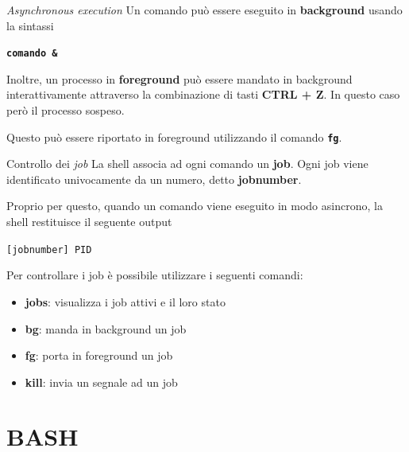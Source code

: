 \documentclass{beamer}
\begin{document}
    \begin{frame}{\textit{Asynchronous execution}}
        Un comando può essere eseguito in \textbf{background} usando la sintassi
        \begin{center}
            \texttt{\textbf{comando \&}}
        \end{center}

        \vspace{0.5cm}

        Inoltre, un processo in \textbf{foreground} può essere mandato
        in background interattivamente attraverso la combinazione di tasti
        \textbf{CTRL + Z}. In questo caso però il processo sospeso.

        \vspace{0.5cm}

        Questo può essere riportato in foreground utilizzando il comando \texttt{\textbf{fg}}.
    \end{frame}

    \begin{frame}{Controllo dei \textit{job}}
        La shell associa ad ogni comando un \textbf{job}. Ogni job
        viene identificato univocamente da un numero, detto \textbf{jobnumber}.

        Proprio per questo, quando un comando viene eseguito in modo asincrono, la shell restituisce il seguente output
        \begin{center}
            \texttt{[jobnumber] PID}
        \end{center}

        Per controllare i job è possibile utilizzare i seguenti comandi:

        \begin{itemize}
            \item \textbf{jobs}: visualizza i job attivi e il loro stato
            \item \textbf{bg}: manda in background un job
            \item \textbf{fg}: porta in foreground un job
            \item \textbf{kill}: invia un segnale ad un job
        \end{itemize}
    \end{frame}

    \section{BASH}
\end{document}
